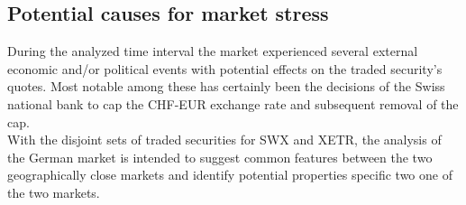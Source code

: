 \documentclass[11pt,twoside,a4paper]{article}
\numberwithin{equation}{section}
\begin{document}
\subsection{Potential causes for market stress}
During the analyzed time interval the market experienced several external economic and/or political events with potential effects on the traded security's quotes. Most notable among these has certainly been the decisions of the Swiss national bank to cap the CHF-EUR exchange rate and subsequent removal of the cap.\\

With the disjoint sets of traded securities for SWX and XETR, the analysis of the German market is intended to suggest common features between the two geographically close markets and identify potential properties specific two one of the two markets.\\
\end{document}
